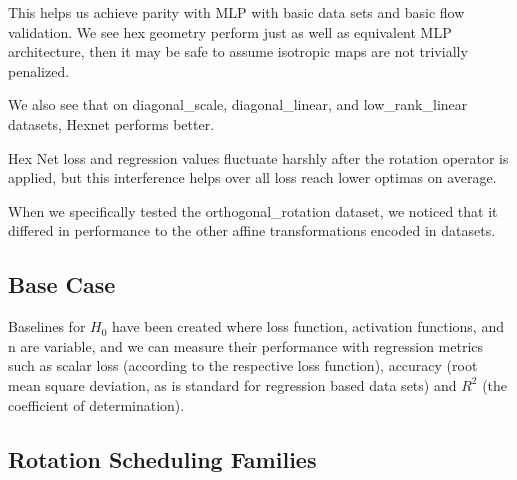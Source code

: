 This helps us achieve parity with MLP with basic data sets and basic flow validation.
We see hex geometry perform just as well as equivalent MLP architecture, then it may be safe to assume isotropic maps are not trivially penalized.

We also see that on diagonal\_scale, diagonal\_linear, and low\_rank\_linear datasets, Hexnet performs better.

Hex Net loss and regression values fluctuate harshly after the rotation operator is applied, but this interference helps over all loss reach lower optimas on average.

When we specifically tested the orthogonal\_rotation dataset, we noticed that it differed in performance to the other affine transformations encoded in datasets.


\subsection{Base Case}
Baselines for $H_0$ have been created where loss function, activation functions, and n are variable, and we can measure their performance with regression metrics such as scalar loss (according to the respective loss function), accuracy (root mean square deviation, as is standard for regression based data sets) and $R^2$ (the coefficient of determination).


\subsection{Rotation Scheduling Families}

